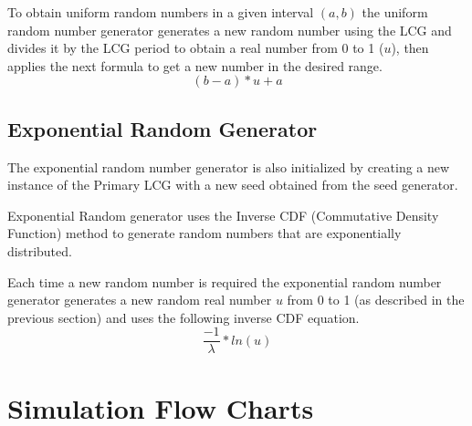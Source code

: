 \documentclass[aps,letterpaper,10pt]{revtex4}
\begin{document}
    To obtain uniform random numbers in a given interval $(a,b)$ the uniform
    random number generator generates a new random number using the LCG and
    divides it by the LCG period to obtain a real number from 0 to 1 ($u$), then
    applies the next formula to get a new number in the desired range.
    \[(b-a)*u + a\]
\subsection{Exponential Random Generator}
    The exponential random number generator is also initialized by creating a
    new instance of the Primary LCG with a new seed obtained from the seed
    generator.

    Exponential Random generator uses the Inverse CDF (Commutative Density
    Function) method to generate random numbers that are exponentially
    distributed.

    Each time a new random number is required the exponential random number
    generator generates a new random real number $u$ from 0 to 1 (as described in
    the previous section) and uses the following inverse CDF equation.
    \[\frac{-1}{\lambda} * ln (u)\]



\newpage
\section{Simulation Flow Charts}
\end{document}
